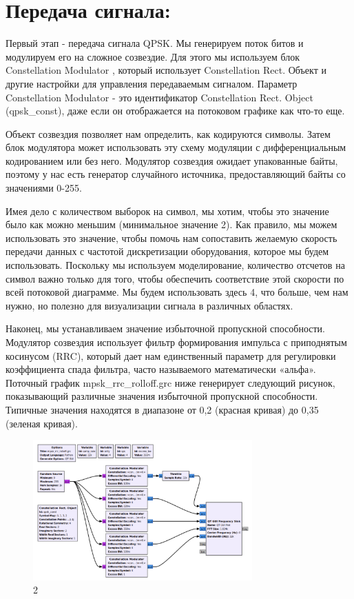 \documentclass[10pt,a4paper,oneside]{article}
\begin{document}
\section{Передача сигнала:}
Первый этап - передача сигнала QPSK. Мы генерируем поток битов и модулируем его на сложное созвездие. Для этого мы используем блок Constellation Modulator , который использует Constellation Rect. Объект и другие настройки для управления передаваемым сигналом. Параметр Constellation Modulator - это идентификатор Constellation Rect. Object (qpsk_const), даже если он отображается на потоковом графике как что-то еще.

Объект созвездия позволяет нам определить, как кодируются символы. Затем блок модулятора может использовать эту схему модуляции с дифференциальным кодированием или без него. Модулятор созвездия ожидает упакованные байты, поэтому у нас есть генератор случайного источника, предоставляющий байты со значениями 0-255.

Имея дело с количеством выборок на символ, мы хотим, чтобы это значение было как можно меньшим (минимальное значение 2). Как правило, мы можем использовать это значение, чтобы помочь нам сопоставить желаемую скорость передачи данных с частотой дискретизации оборудования, которое мы будем использовать. Поскольку мы используем моделирование, количество отсчетов на символ важно только для того, чтобы обеспечить соответствие этой скорости по всей потоковой диаграмме. Мы будем использовать здесь 4, что больше, чем нам нужно, но полезно для визуализации сигнала в различных областях.

Наконец, мы устанавливаем значение избыточной пропускной способности. Модулятор созвездия использует фильтр формирования импульса с приподнятым косинусом (RRC), который дает нам единственный параметр для регулировки коэффициента спада фильтра, часто называемого математически «альфа». Поточный график mpsk_rrc_rolloff.grc ниже генерирует следующий рисунок, показывающий различные значения избыточной пропускной способности. Типичные значения находятся в диапазоне от 0,2 (красная кривая) до 0,35 (зеленая кривая).

\begin{figure}[H]
        \centering
        \includegraphics[width=0.75\textwidth]{pics/0.png}
        \caption{2}
        \label{fig:first}
\end{figure}
\end{document}

